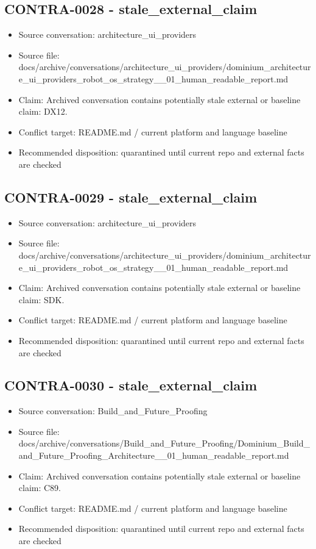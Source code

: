 \documentclass[11pt,a4paper]{report}
\begin{document}
\subsection{CONTRA-0028 - stale\_external\_claim}

\begin{itemize}
\item Source conversation: architecture\_ui\_providers
\item Source file: docs/archive/conversations/architecture\_ui\_providers/dominium\_architecture\_ui\_providers\_robot\_os\_strategy\_\_01\_human\_readable\_report.md
\item Claim: Archived conversation contains potentially stale external or baseline claim: DX12.
\item Conflict target: README.md / current platform and language baseline
\item Recommended disposition: quarantined until current repo and external facts are checked
\end{itemize}

\subsection{CONTRA-0029 - stale\_external\_claim}

\begin{itemize}
\item Source conversation: architecture\_ui\_providers
\item Source file: docs/archive/conversations/architecture\_ui\_providers/dominium\_architecture\_ui\_providers\_robot\_os\_strategy\_\_01\_human\_readable\_report.md
\item Claim: Archived conversation contains potentially stale external or baseline claim: SDK.
\item Conflict target: README.md / current platform and language baseline
\item Recommended disposition: quarantined until current repo and external facts are checked
\end{itemize}

\subsection{CONTRA-0030 - stale\_external\_claim}

\begin{itemize}
\item Source conversation: Build\_and\_Future\_Proofing
\item Source file: docs/archive/conversations/Build\_and\_Future\_Proofing/Dominium\_Build\_and\_Future\_Proofing\_Architecture\_\_01\_human\_readable\_report.md
\item Claim: Archived conversation contains potentially stale external or baseline claim: C89.
\item Conflict target: README.md / current platform and language baseline
\item Recommended disposition: quarantined until current repo and external facts are checked
\end{itemize}
\end{document}
